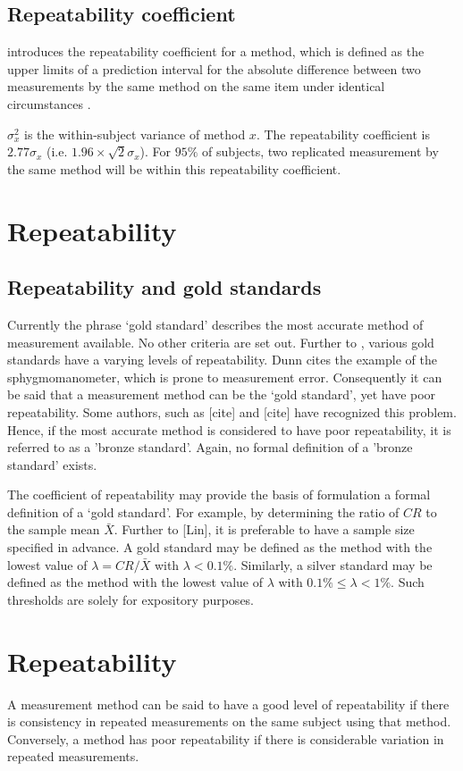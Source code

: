 \subsection{Repeatability coefficient}
\citet{BA99} introduces the repeatability coefficient for a method, which is defined as the upper limits of a prediction interval for the absolute difference between two measurements by the same
method on the same item under identical circumstances \citep{BXC2008}.

$\sigma^2_{x}$ is the within-subject variance of method $x$. The repeatability coefficient is $2.77 \sigma_{x}$ (i.e. $1.96 \times \sqrt{2} \sigma_{x}$). For $95\%$ of subjects, two replicated measurement by the same method will be within this repeatability coefficient.

\newpage
\section{Repeatability}
\subsection{Repeatability and gold standards}
Currently the phrase `gold standard' describes the most accurate method of measurement available. No other criteria are set out. Further to \citet{dunnSEME}, various gold standards have a varying levels of repeatability. Dunn cites the example of the sphygmomanometer, which is prone to measurement error. Consequently it can be said that a measurement method can be the `gold standard', yet have poor repeatability. Some authors, such as [cite] and [cite] have recognized this problem. Hence, if the most accurate method is considered to have poor repeatability, it is referred to as a 'bronze standard'.  Again, no formal definition of a 'bronze standard' exists.

The coefficient of repeatability may provide the basis of formulation a formal definition of a `gold standard'. For example, by determining the ratio of $CR$ to the sample mean $\bar{X}$. Further to [Lin], it is preferable to have a sample size specified in advance. A gold standard may be defined as the method with the lowest value of $\lambda = CR /\bar{X}$ with $\lambda < 0.1\%$. Similarly, a silver standard may be defined as the method with the lowest value of $\lambda $ with $0.1\% \leq \lambda < 1\%$. Such thresholds are solely for expository purposes.

\section{Repeatability}
A measurement method can be said to have a good level of repeatability if there is consistency in repeated measurements on the same subject using that method. Conversely, a method has poor repeatability if there is considerable variation in repeated measurements.

